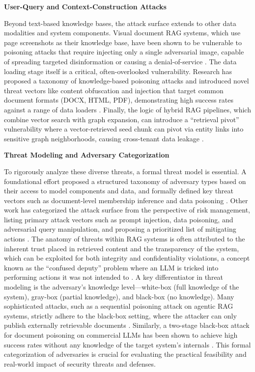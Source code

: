 \documentclass[11pt]{article}
\begin{document}
\textbf{User-Query and Context-Construction Attacks}

Beyond text-based knowledge bases, the attack surface extends to other data modalities and system components. Visual document RAG systems, which use page screenshots as their knowledge base, have been shown to be vulnerable to poisoning attacks that require injecting only a single adversarial image, capable of spreading targeted disinformation or causing a denial-of-service \cite{ref468}. The data loading stage itself is a critical, often-overlooked vulnerability. Research has proposed a taxonomy of knowledge-based poisoning attacks and introduced novel threat vectors like content obfuscation and injection that target common document formats (DOCX, HTML, PDF), demonstrating high success rates against a range of data loaders \cite{ref469}. Finally, the logic of hybrid RAG pipelines, which combine vector search with graph expansion, can introduce a ``retrieval pivot'' vulnerability where a vector-retrieved seed chunk can pivot via entity links into sensitive graph neighborhoods, causing cross-tenant data leakage \cite{ref470}.

\textbf{Threat Modeling and Adversary Categorization}

To rigorously analyze these diverse threats, a formal threat model is essential. A foundational effort proposed a structured taxonomy of adversary types based on their access to model components and data, and formally defined key threat vectors such as document-level membership inference and data poisoning \cite{ref79}. Other work has categorized the attack surface from the perspective of risk management, listing primary attack vectors such as prompt injection, data poisoning, and adversarial query manipulation, and proposing a prioritized list of mitigating actions \cite{ref471}. The anatomy of threats within RAG systems is often attributed to the inherent trust placed in retrieved content and the transparency of the system, which can be exploited for both integrity and confidentiality violations, a concept known as the ``confused deputy'' problem where an LLM is tricked into performing actions it was not intended to \cite{ref472}. A key differentiator in threat modeling is the adversary's knowledge level---white-box (full knowledge of the system), gray-box (partial knowledge), and black-box (no knowledge). Many sophisticated attacks, such as a sequential poisoning attack on agentic RAG systems, strictly adhere to the black-box setting, where the attacker can only publish externally retrievable documents \cite{ref430}. Similarly, a two-stage black-box attack for document poisoning on commercial LLMs has been shown to achieve high success rates without any knowledge of the target system's internals \cite{ref473}. This formal categorization of adversaries is crucial for evaluating the practical feasibility and real-world impact of security threats and defenses.
\end{document}
